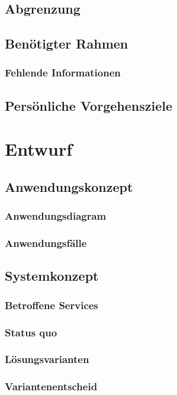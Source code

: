 \section{Abgrenzung}

\section{Benötigter Rahmen}
\subsection{Fehlende Informationen}

\section{Persönliche Vorgehensziele}



\chapter{Entwurf}
\section{Anwendungskonzept}
\subsection{Anwendungsdiagram}
\subsection{Anwendungsfälle}

\section{Systemkonzept}
\subsection{Betroffene Services}
\subsection{Status quo}
\subsection{Lösungsvarianten}
\subsection{Variantenentscheid}

